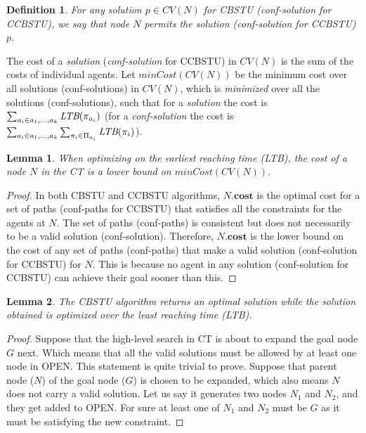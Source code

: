 \documentclass{article}
\newtheorem{definition}{Definition}
\newtheorem{lemma}{Lemma}
\begin{document}
{%
\begin{definition}
For any solution $p \in CV(N)$ for CBSTU (conf-solution for CCBSTU), we say that node $N$ permits the solution (conf-solution for CCBSTU) $p$.
\end{definition}

The cost of a \emph{solution} (\emph{conf-solution} for CCBSTU) in $CV(N)$ is the sum of the costs of individual agents. 
Let $minCost(CV(N))$ be the minimum cost over all solutions (conf-solutions) in $CV(N)$, which is \emph{minimized} over all the solutions (conf-solutions), such that for a \emph{solution} the cost is $\sum_{a_i \in {a_1,...,a_k}} \emph{LTB}(\pi_{a_i})$ 
(for a \emph{conf-solution} the cost is $\sum_{a_i \in {a_1,...,a_k}} \sum_{\pi_i \in \Pi_{a_i}} \emph{LTB}(\pi_i)$).

\begin{lemma}
When optimizing on the earliest reaching time (LTB), the cost of a node $N$ in the CT is a lower bound on $minCost(CV(N)).$ 
\end{lemma}
\begin{proof}
In both CBSTU and CCBSTU algorithms, $N.\mathbf{cost}$ is the optimal cost for a set of paths (conf-paths for CCBSTU) that satisfies all the constraints for the agents at $N$.  
The set of paths (conf-paths) is consistent but does not necessarily to be a valid solution (conf-solution).
Therefore, $N.\mathbf{cost}$ is the lower bound on the cost of any set of paths (conf-paths) that make a valid solution (conf-solution for CCBSTU) for $N$. 
This is because no agent in any solution (conf-solution for CCBSTU) can achieve their goal sooner than this. 
\end{proof}
\begin{lemma}
The CBSTU algorithm returns an optimal solution while the solution obtained is optimized over the least reaching time (LTB).
\end{lemma}
\begin{proof}
Suppose that the high-level search in CT is about to expand the goal node $G$ next. Which means that all the valid solutions must be allowed by at least one node in OPEN. This statement is quite trivial to prove. Suppose that parent node ($N$) of the goal node ($G$) is chosen to be expanded, which also means $N$ does not carry a valid solution. Let us say it generates two nodes $N_1$ and $N_2$, and they get added to OPEN. For sure at least one of $N_1$ and $N_2$ must be $G$ as it must be satisfying the new constraint.


\end{proof}}
\end{document}
